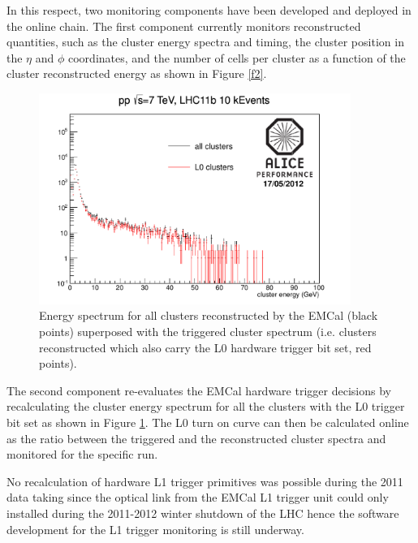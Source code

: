 In this respect, two monitoring components have been developed and deployed in the online chain.
The first component currently monitors reconstructed quantities, such as the cluster energy spectra and timing, 
the cluster position in the $\eta$ and $\phi$ coordinates, and the number of cells per cluster 
as a function of the cluster reconstructed energy as shown in Figure \ref{f2}.

\begin{figure}[h]
\includegraphics[width=24pc]{figures/l0clusters.pdf}
\begin{center}
\caption{\label{f3} Energy spectrum for all clusters reconstructed by the EMCal (black points) superposed with the triggered cluster spectrum
(i.e. clusters reconstructed which also carry the L0 hardware trigger bit set, red points). }
\end{center} 
\end{figure}

The second component re-evaluates the EMCal hardware trigger decisions by recalculating
the cluster energy spectrum for all the clusters with the L0 trigger bit set as shown 
in Figure \ref{f3}. The L0 turn on curve can then be calculated online as the ratio between
the triggered and the reconstructed cluster spectra and monitored for the specific run.


No recalculation of hardware L1 trigger primitives was possible
during the 2011 data taking since the optical link from the EMCal L1 trigger unit 
could only installed during the 2011-2012 winter shutdown of the LHC hence
the software development for the L1 trigger monitoring is still underway.

